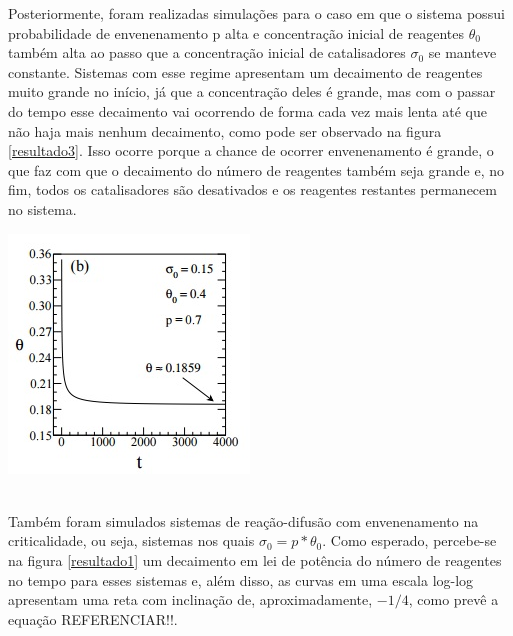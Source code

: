 Posteriormente, foram realizadas simulações para o caso em que o sistema possui
probabilidade de envenenamento p alta e concentração inicial de reagentes
$\theta_0$ também alta ao passo que a concentração inicial de catalisadores
$\sigma_0$ se manteve constante. Sistemas com esse regime apresentam um
decaimento de reagentes muito grande no início, já que a concentração deles
é grande, mas com o passar do tempo esse decaimento vai ocorrendo de forma
cada vez mais lenta até que não haja mais nenhum decaimento, como pode ser
observado na figura \ref{resultado3}. Isso ocorre porque a chance de ocorrer
envenenamento é grande, o que faz com que o decaimento do número de reagentes
também seja grande e, no fim, todos os catalisadores são desativados e os
reagentes restantes permanecem no sistema.

{ \centering
	\captionsetup{type=figure}
	\includegraphics[width=\columnwidth]{./figures/053-Resultado.jpg}\\
	\label{resultado3}
		\hspace{\columnwidth}\\
}

Também foram simulados sistemas de reação-difusão com envenenamento na
criticalidade, ou seja, sistemas nos quais $\sigma_0 = p*\theta_0$. Como
esperado, percebe-se na figura \ref{resultado1} um decaimento em lei de potência
do número de reagentes no tempo para esses sistemas e, além disso, as curvas em
uma escala log-log apresentam uma reta com inclinação de, aproximadamente,
$-1/4$, como prevê a equação REFERENCIAR!!.

